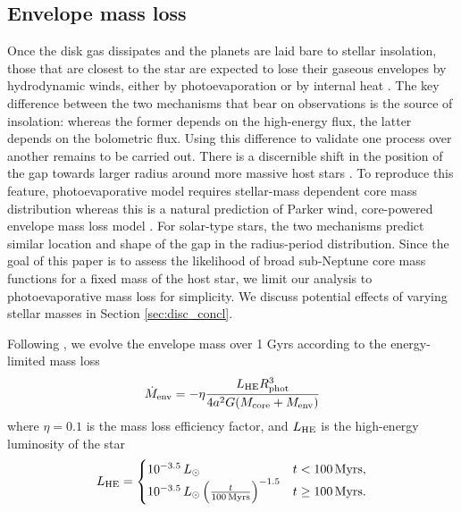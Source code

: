 \documentclass[twocolumn]{aastex63}
\begin{document}
\subsection{Envelope mass loss}

Once the disk gas dissipates and the planets are laid bare to stellar insolation, those that are closest to the star are expected to lose their gaseous envelopes by hydrodynamic winds, either by photoevaporation \citep[e.g.,][]{Owen13} or by internal heat \citep[e.g.,][]{Ikoma12,Owen16,Ginzburg18}. 
The key difference between the two mechanisms 
that bear on observations
is the source of insolation: whereas the former depends on the high-energy flux, the latter depends on the bolometric flux. Using this difference to validate one process over another remains to be carried out.
There is a discernible shift in the position of the gap towards larger radius around more massive host stars \citep{Fulton18,Cloutier20,Berger20} . To reproduce this feature, photoevaporative model requires stellar-mass dependent core mass distribution \citep{Wu19} whereas this is a natural prediction of Parker wind, core-powered envelope mass loss model \citep{Gupta20}.
For solar-type stars, the two mechanisms predict similar location and shape of the gap in the radius-period distribution. Since the goal of this paper is to assess the likelihood of broad sub-Neptune core mass functions for a fixed mass of the host star, we limit our analysis to photoevaporative mass loss for simplicity. We discuss potential effects of varying stellar masses in Section \ref{sec:disc_concl}.

Following \citet{Owen17}, we evolve the envelope mass over 1 Gyrs according to the energy-limited mass loss \citep[e.g.,][]{Lopez13}
%
\begin{equation}
    \dot{M}_{\rm env} = -\eta \frac{L_{\rm HE} R_{\rm phot}^3}{4a^2G(M_{\rm core} + M_{\rm env})}
\end{equation}
%
where $\eta = 0.1$ is the mass loss efficiency factor, and $L_{\rm HE}$ is the high-energy luminosity of the star \citep[e.g.,][]{Ribas05,Jackson12}
%
\begin{equation}
    L_{\rm HE} = \begin{cases}
    10^{-3.5}\,L_\odot & t < 100\,{\rm Myrs},\\
    10^{-3.5}\,L_\odot\left(\frac{t}{100\,{\rm Myrs}}\right)^{-1.5} & t \geq 100\,{\rm Myrs}.
    \end{cases}
\end{equation}
\end{document}
